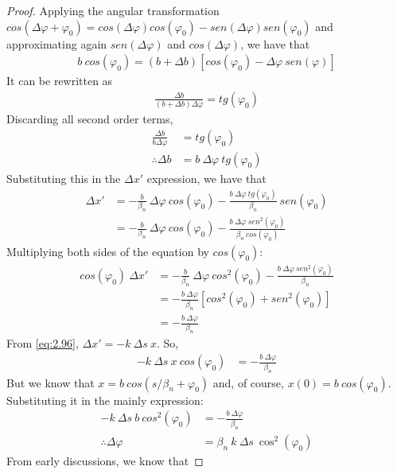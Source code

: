 \begin{proof}
	Applying the angular transformation $cos(\Delta \varphi + \varphi_0) = cos(\Delta \varphi)cos(\varphi_0) - sen(\Delta \varphi)sen(\varphi_0)$ and approximating again $sen(\Delta \varphi)$ and $cos(\Delta \varphi)$, we have that
	\begin{align*}
		b\ cos(\varphi_0) = (b+\Delta b)[cos(\varphi_0)-\Delta \varphi\ sen(\varphi)]
	\end{align*}
	It can be rewritten as 
	\begin{align*}
		\frac{\Delta b}{(b+\Delta b)\Delta \varphi} = tg(\varphi_0)
	\end{align*}
	Discarding all second order terms,
	\begin{align*}
		\frac{\Delta b}{b \Delta \varphi} &= tg(\varphi_0)\\
		\therefore \Delta b &= b\ \Delta \varphi\ tg(\varphi_0)
	\end{align*}
	Substituting this in the  $\Delta x'$ expression, we have that
	\begin{align*}
		\Delta x' &= -\frac{b}{\beta_n}\ \Delta \varphi\ cos(\varphi_0) - \frac{b\ \Delta \varphi\ tg(\varphi_0)}{\beta_n}\ sen(\varphi_0)\\
				  &= -\frac{b}{\beta_n}\ \Delta \varphi\ cos(\varphi_0) - \frac{b\ \Delta \varphi\ sen^2(\varphi_0)}{\beta_n\ cos(\varphi_0)}
	\end{align*}
	Multiplying both sides of the equation by $cos(\varphi_0)$:
	\begin{align*}
		cos(\varphi_0)\ \Delta x' &= -\frac{b}{\beta_n}\ \Delta \varphi\ cos^2(\varphi_0) - \frac{b\ \Delta \varphi\ sen^2(\varphi_0)}{\beta_n}\\
			&= -\frac{b\ \Delta \varphi}{\beta_n}[cos^2(\varphi_0)+sen^2(\varphi_0)]\\
			&= -\frac{b\ \Delta \varphi}{\beta_n}
	\end{align*}
	From \eqref{eq:2.96}, $\Delta x' = -k\ \Delta s\ x$. So,
	\begin{align*}
		-k\ \Delta s\ x\ cos(\varphi_0) &= -\frac{b\ \Delta \varphi}{\beta_n}
	\end{align*}
	But we know that $x = b\ cos(s/\beta_n + \varphi_0)$ and, of course, $x(0) = b\ cos(\varphi_0)$. Substituting it in the mainly expression:
	\begin{align*}
		-k\ \Delta s\ b\ cos^2(\varphi_0) &= -\frac{b\ \Delta \varphi}{\beta_n}\\
		\therefore \Delta \varphi &= \beta_n\ k\ \Delta s\ \cos^2(\varphi_0)
	\end{align*}
	From early discussions, we know that

\end{proof}
